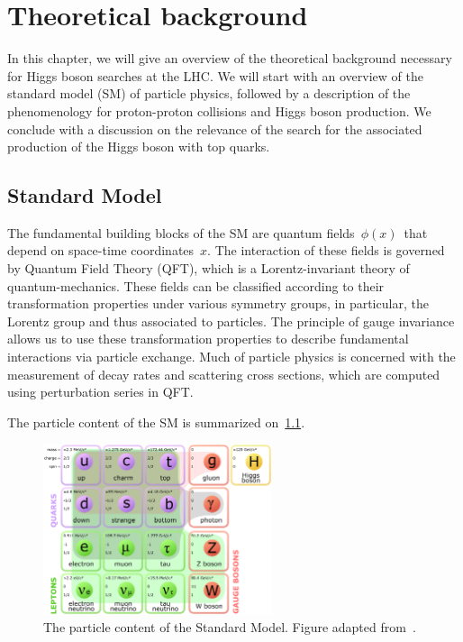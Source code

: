 \chapter{Theoretical background}
In this chapter, we will give an overview of the theoretical background necessary for Higgs boson searches at the LHC. We will start with an overview of the standard model (SM) of particle physics, followed by a description of the phenomenology for proton-proton collisions and Higgs boson production. We conclude with a discussion on the relevance of the search for the associated production of the Higgs boson with top quarks.

\section{Standard Model}
The fundamental building blocks of the SM are quantum fields~$\phi(x)$~that depend on space-time coordinates~$x$. The interaction of these fields is governed by Quantum Field Theory (QFT), which is a Lorentz-invariant theory of quantum-mechanics. These fields can be classified according to their transformation properties under various symmetry groups, in particular, the Lorentz group and thus associated to particles. The principle of gauge invariance allows us to use these transformation properties to describe fundamental interactions via particle exchange. Much of particle physics is concerned with the measurement of decay rates and scattering cross sections, which are computed using perturbation series in QFT.

The particle content of the SM is summarized on~\cref{fig:standard_model}.

\begin{figure}
\begin{centering}
\includegraphics[width=0.6\textwidth]{figures/theory/Standard_Model_of_Elementary_Particles_modified_version.eps}
\caption[The particle content of the Standard Model]{The particle content of the Standard Model. Figure adapted from~\cite{wikipediaSM}.}
\label{fig:standard_model}
\end{centering}
\end{figure}


